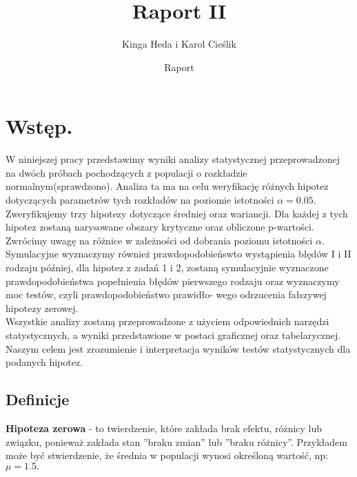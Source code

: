 \documentclass[12pt,letterpaper]{article}
\title{Raport II}
\author{Kinga Heda i Karol Cieślik}
\date{Raport}
\theoremstyle{definition}
\begin{document}
\setcounter{page}{1} %
\maketitle


\tableofcontents


%





\section{Wstęp.}
W niniejszej pracy przedstawimy wyniki analizy statystycznej przeprowadzonej na dwóch próbach pochodzących z populacji  o rozkładzie normalnym(sprawdzono). Analiza ta ma na celu weryfikację różnych hipotez dotyczących parametrów tych rozkładów na poziomie istotności $\alpha = 0.05.$\\

Zweryfikujemy trzy hipotezy dotyczące średniej oraz wariancji. Dla każdej z tych hipotez zostaną narysowane obszary krytyczne oraz obliczone p-wartości. Zwrócimy uwagę na różnice w zależności od dobrania poziomu istotności $\alpha$.\\

Symulacyjne wyznaczymy również prawdopodobieńswto wystąpienia błędów I i II rodzaju później, dla hipotez z zadań 1 i 2, zostaną symulacyjnie wyznaczone prawdopodobieństwa popełnienia błędów pierwszego rodzaju oraz wyznaczymy moc testów, czyli prawdopodobieństwo prawidło- wego odrzucenia fałszywej hipotezy zerowej.\\

Wszystkie analizy zostaną przeprowadzone z użyciem odpowiednich narzędzi statystycznych, a wyniki przedstawione w postaci graficznej oraz tabelarycznej. Naszym celem jest zrozumienie i interpretacja wyników testów statystycznych dla podanych hipotez.
\\

\subsection{Definicje}

\textbf{Hipoteza zerowa} - to twierdzenie, które zakłada brak efektu, różnicy lub związku, ponieważ zakłada stan ”braku zmian” lub ”braku różnicy”. Przykładem może być stwierdzenie, że średnia w populacji wynosi określoną wartość, np: $\mu = 1.5.$\\
\end{document}
